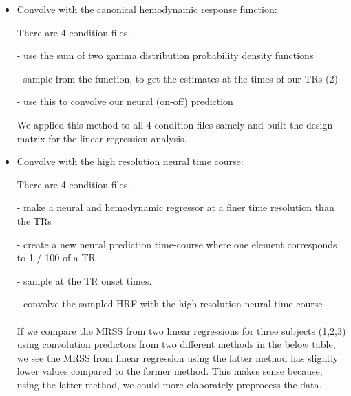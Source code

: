 \begin{itemize}
\item Convolve with the canonical hemodynamic response function:\\
\par There are 4 condition files.\\
\par - use the sum of two gamma distribution probability density functions\\
\par - sample from the function, to get the estimates at the times of our TRs (2)\\
\par - use this to convolve our neural (on-off) prediction\\
\par We applied this method to all 4 condition files samely and built the design matrix for the linear regression analysis. \\


\item Convolve with the high resolution neural time course:\\
\par There are 4 condition files.\\
\par - make a neural and hemodynamic regressor at a finer time resolution than the TRs\\
\par - create a new neural prediction time-course where one element corresponds to 1 / 100 of a TR\\
\par - sample at the TR onset times.
\par - convolve the sampled HRF with the high resolution neural time course\\


\\
If we compare the MRSS from two linear regressions for three subjects (1,2,3) using convolution predictors from two different methods in the below table, we see the MRSS from linear regression using the latter method has slightly lower values compared to the former method. This makes sense because, using the latter method, we could more elaborately preprocess the data.
\end {itemize}
